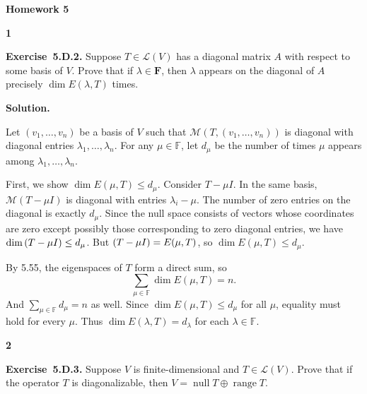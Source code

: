 \documentclass[11pt]{article}
\newcommand{\AssignmentType}{Homework 5}
\newcommand{\AssignmentNumber}{}
\newcommand{\ProblemDivider}[1]{%
  \vspace{1.0em}
  \noindent\textbf{#1}\par
  \vspace{0.35em}
}
\newcommand{\ProblemAnnounce}{\noindent}
\newcommand{\SolutionAnnounce}{\noindent\textbf{Solution.}\par\medskip}
\newcommand{\Exercise}[1]{\textbf{Exercise~#1.}\;}
\newcommand{\F}{\mathbb{F}}
\begin{document}
\begin{center}
  {\Large \textbf{\AssignmentType~\AssignmentNumber}}
\end{center}
\vspace{0.75em}

\ProblemDivider{1}
\begin{problemBox}
\ProblemAnnounce
\Exercise{5.D.2}
Suppose \(T \in \mathcal{L}(V)\) has a diagonal matrix \(A\) with respect to some basis of \(V\). Prove that if \(\lambda \in \mathbf{F}\), then \(\lambda\) appears on the diagonal of \(A\) precisely \(\dim E(\lambda, T)\) times.
\end{problemBox}

\begin{solutionBox}
\SolutionAnnounce
\doublespacing
Let \((v_1,\dots,v_n)\) be a basis of \(V\) such that \(\mathcal{M}(T,(v_1,\dots,v_n))\) is diagonal with diagonal entries \(\lambda_1,\dots,\lambda_n\). For any \(\mu \in \F\), let \(d_\mu\) be the number of times \(\mu\) appears among \(\lambda_1,\dots,\lambda_n\).

First, we show \(\dim E(\mu,T) \le d_\mu\). Consider \(T - \mu I\). In the same basis, \(\mathcal{M}(T-\mu I)\) is diagonal with entries \(\lambda_i - \mu\). The number of zero entries on the diagonal is exactly \(d_\mu\). Since the null space consists of vectors whose coordinates are zero except possibly those corresponding to zero diagonal entries, we have \(\dim \null(T-\mu I) \le d_\mu\). But \(\null(T-\mu I) = E(\mu,T)\), so \(\dim E(\mu,T) \le d_\mu\).

By 5.55, the eigenspaces of \(T\) form a direct sum, so 
\[
\sum_{\mu \in \F} \dim E(\mu,T) = n.
\]
And \(\sum_{\mu \in \F} d_\mu = n\) as well. Since \(\dim E(\mu,T) \le d_\mu\) for all \(\mu\), equality must hold for every \(\mu\). Thus \(\dim E(\lambda,T) = d_\lambda\) for each \(\lambda \in \F\).
\end{solutionBox}

\ProblemDivider{2}

\begin{problemBox}
\ProblemAnnounce
\Exercise{5.D.3}
Suppose \(V\) is finite-dimensional and \(T \in \mathcal{L}(V)\). Prove that if the operator \(T\) is diagonalizable, then \(V = \operatorname{null} T \oplus \operatorname{range} T\).
\end{problemBox}
\end{document}
